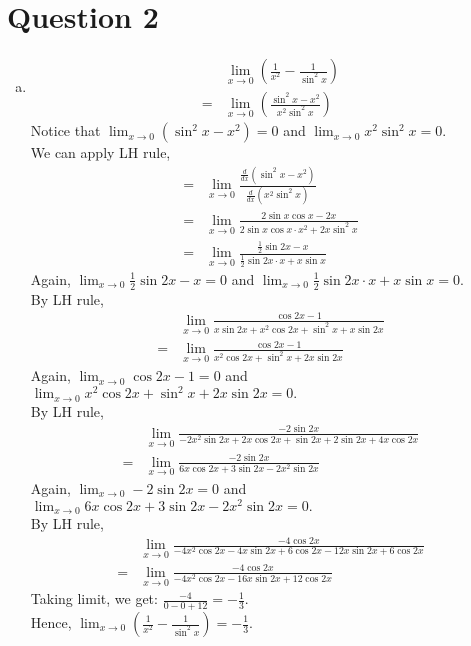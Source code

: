 \documentclass[11pt]{article}
\begin{document}
\section*{Question 2}
\begin{enumerate}[(a)]
    \item \begin{align*}
        &\lim_{x\to 0} \left(\frac{1}{x^2}-\frac{1}{\sin^2 x}\right)\\
        =&\lim_{x \to 0} \left(\frac{\sin^2 x -x^2}{x^2\sin^2 x}\right)
    \end{align*}
    Notice that $\displaystyle \lim_{x\to 0}(\sin^2 x - x^2)=0$ and $\displaystyle \lim_{x\to 0}x^2\sin^2 x = 0$. \\
    We can apply LH rule, 
    \begin{align*}
        =& \lim_{x\to 0}\frac{\frac{d}{dx}(\sin^2 x -x^2)}{\frac{d}{dx}(x^2 \sin^2 x)}\\
        =& \lim_{x\to 0} \frac{2\sin x \cos x -2x}{2\sin x \cos x\cdot x^2+2x\sin^2 x}\\
        =& \lim_{x\to 0}\frac{\frac{1}{2}\sin 2x-x}{\frac{1}{2}\sin 2x \cdot x+x\sin x }
    \end{align*}
    Again, $\displaystyle \lim_{x\to 0}\frac{1}{2}\sin 2x-x=0$ and $\displaystyle \lim_{x\to 0}\frac{1}{2}\sin 2x \cdot x+x\sin x=0.$\\
    By LH rule, 
    \begin{align*}
        &\lim_{x\to 0}\frac{\cos 2x-1}{x\sin 2x +x^2 \cos 2x+\sin^2 x + x\sin2x}\\
        =& \lim_{x\to 0} \frac{\cos 2x-1}{x^2 \cos 2x + \sin^2x +2x\sin 2x}
    \end{align*}
    Again, $\displaystyle \lim_{x\to 0} \cos 2x-1=0$ and $\displaystyle \lim_{x\to 0} x^2 \cos 2x + \sin^2 x +2x\sin 2x=0.$\\
    By LH rule, 
    \begin{align*}
        &\lim_{x\to 0} \frac{-2\sin 2x}{-2x^2 \sin 2x+2x\cos 2x + \sin 2x+ 2\sin 2x +4x \cos 2x}\\
        =& \lim_{x \to 0}\frac{-2\sin 2x}{6x\cos 2x +3 \sin 2x -2x^2 \sin 2x}
    \end{align*}
    Again, $\displaystyle \lim_{x\to 0} -2\sin 2x=0$ and $\displaystyle \lim_{x\to 0} 6x\cos 2x +3 \sin 2x -2x^2 \sin 2x=0.$\\
    By LH rule,
    \begin{align*}
        &\lim_{x\to 0}\frac{-4\cos 2x}{-4x^2 \cos 2x -4x\sin 2x + 6\cos 2x -12 x \sin 2x + 6\cos 2x}\\
        =& \lim_{x\to 0}\frac{-4\cos 2x}{-4x^2\cos 2x -16x\sin 2x+12 \cos 2x}
    \end{align*}
    Taking limit, we get: $\displaystyle \frac{-4}{0-0+12}=-\frac{1}{3}.$\\
    Hence, $\displaystyle \lim_{x \to 0}\left(\frac{1}{x^2}-\frac{1}{\sin^2 x}\right)= -\frac{1}{3}.$


\end{enumerate}
\end{document}
